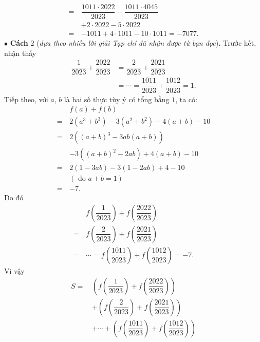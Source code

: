 \begin{multicols}{2}
\begin{align*}
			 = \,&\dfrac{{1011 \cdot 2022}}{{2023}} - \dfrac{{1011 \cdot 4045}}{{2023}} \\
			 &+ 2 \cdot 2022 - 5 \cdot 2022\\
			 =  \,&- 1011 + 4 \cdot 1011 - 10 \cdot 1011 =  - 7077.
	\end{align*}
	$\bullet$ \textbf{\color{thachthuctoanhoc}Cách} $2$ (\textit{dựa theo nhiều lời giải Tạp chí đã nhận được từ bạn đọc})\textbf{\color{thachthuctoanhoc}.}
	\vskip 0.05cm
	Trước hết, nhận thấy
	\begin{align*}
		\dfrac{1}{{2023}} + \dfrac{{2022}}{{2023}} &= \dfrac{2}{{2023}} + \dfrac{{2021}}{{2023}} \\
		&=  \cdots  = \dfrac{{1011}}{{2023}} + \dfrac{{1012}}{{2023}} = 1.
	\end{align*}
	Tiếp theo, với $a$, $b$ là hai số thực tùy ý có tổng bằng $1$, ta có:
	\begin{align*}
			&f\left( a \right) + f\left( b \right)\\[-0.3ex]
			 = \,&2\left( {{a^3} \!+\! {b^3}} \right) \!-\! 3\left( {{a^2} \!+\! {b^2}} \right) \!+\! 4\left( {a \!+\! b} \right) \!-\! 10\\[-0.3ex]
			 = \,&2\left( {{{\left( {a + b} \right)}^3} - 3ab\left( {a + b} \right)} \right) \\[-0.3ex]
			 &- 3\left( {{{\left( {a + b} \right)}^2} - 2ab} \right) + 4\left( {a + b} \right) - 10\\[-0.3ex]
			 = \,&2\left( {1 - 3ab} \right) - 3\left( {1 - 2ab} \right) + 4 - 10\\
			 &(\text{{ do }}a + b = 1)\\[-0.3ex]
			 =  \,&- 7.
	\end{align*}
	Do đó
	\begin{align*}
		&f\left( {\dfrac{1}{{2023}}} \right) + f\left( {\dfrac{{2022}}{{2023}}} \right) \\
		= \,&f\left( {\dfrac{2}{{2023}}} \right) + f\left( {\dfrac{{2021}}{{2023}}} \right) \\
		= \,& \cdots  = f\left( {\dfrac{{1011}}{{2023}}} \right) + f\left( {\dfrac{{1012}}{{2023}}} \right) =  - 7.
	\end{align*}
	Vì vậy
	\begin{align*}
			S =\,& \left( {f\left( {\dfrac{1}{{2023}}} \right) + f\left( {\dfrac{{2022}}{{2023}}} \right)} \right) \\
			&+ \left( {f\left( {\dfrac{2}{{2023}}} \right) + f\left( {\dfrac{{2021}}{{2023}}} \right)} \right) \\
			&+  \cdots  + \left( {f\left( {\dfrac{{1011}}{{2023}}} \right) + f\left( {\dfrac{{1012}}{{2023}}} \right)} \right)\\

\end{align*}
\end{multicols}
